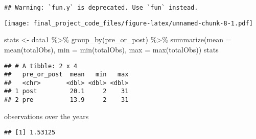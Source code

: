 \documentclass[
]{article}
\newenvironment{Shaded}{\begin{snugshade}}{\end{snugshade}}
\newcommand{\AttributeTok}[1]{\textcolor[rgb]{0.77,0.63,0.00}{#1}}
\newcommand{\DecValTok}[1]{\textcolor[rgb]{0.00,0.00,0.81}{#1}}
\newcommand{\FunctionTok}[1]{\textcolor[rgb]{0.00,0.00,0.00}{#1}}
\newcommand{\NormalTok}[1]{#1}
\newcommand{\OtherTok}[1]{\textcolor[rgb]{0.56,0.35,0.01}{#1}}
\newcommand{\SpecialCharTok}[1]{\textcolor[rgb]{0.00,0.00,0.00}{#1}}
\begin{document}
\begin{verbatim}
## Warning: `fun.y` is deprecated. Use `fun` instead.
\end{verbatim}

\texttt{[image: final\_project\_code\_files/figure-latex/unnamed-chunk-8-1.pdf]}

\begin{Shaded}
\begin{Highlighting}[]
\NormalTok{stats }\OtherTok{\textless{}{-}}\NormalTok{ data1 }\SpecialCharTok{\%\textgreater{}\%} \FunctionTok{group\_by}\NormalTok{(pre\_or\_post) }\SpecialCharTok{\%\textgreater{}\%} 
  \FunctionTok{summarize}\NormalTok{(}\AttributeTok{mean =} \FunctionTok{mean}\NormalTok{(totalObs), }\AttributeTok{min =} \FunctionTok{min}\NormalTok{(totalObs),}
            \AttributeTok{max =} \FunctionTok{max}\NormalTok{(totalObs))}
\NormalTok{stats}
\end{Highlighting}
\end{Shaded}

\begin{verbatim}
## # A tibble: 2 x 4
##   pre_or_post  mean   min   max
##   <chr>       <dbl> <dbl> <dbl>
## 1 post         20.1     2    31
## 2 pre          13.9     2    31
\end{verbatim}

observations over the years

\begin{Shaded}
\end{Shaded}

\begin{verbatim}
## [1] 1.53125
\end{verbatim}

\begin{Shaded}
\end{Shaded}
\end{document}
